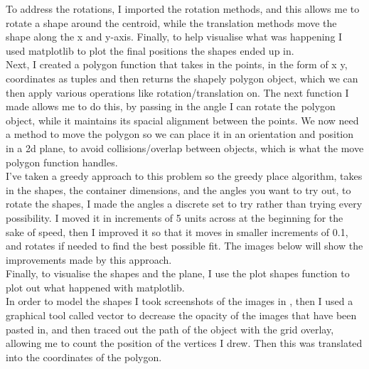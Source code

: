 \documentclass[a4paper]{article}
\begin{document}
    To address the rotations, I imported the rotation methods, and this allows me to rotate a shape around the centroid, while the translation methods move the shape along the x and y-axis. Finally, to help visualise what was happening I used matplotlib to plot the final positions the shapes ended up in.\\

    Next, I created a polygon function that takes in the points, in the form of x y, coordinates as tuples and then returns the shapely polygon object, which we can then apply various operations like rotation/translation on. The next function I made allows me to do this, by passing in the angle I can rotate the polygon object, while it maintains its spacial alignment between the points. We now need a method to move the polygon so we can place it in an orientation and position in a 2d plane, to avoid collisions/overlap between objects, which is what the move polygon function handles. \\


    I've taken a greedy approach to this problem so the greedy place algorithm, takes in the shapes, the container dimensions, and the angles you want to try out, to rotate the shapes, I made the angles a discrete set to try rather than trying every possibility. I moved it in increments of 5 units across at the beginning for the sake of speed, then I improved it so that it moves in smaller increments of 0.1, and rotates if needed to find the best possible fit. The images below will show the improvements made by this approach.\\

    Finally, to visualise the shapes and the plane, I use the plot shapes function to plot out what happened with matplotlib. \\

    In order to model the shapes I took screenshots of the images in \cite{bismark}, then I used a graphical tool called vector to decrease the opacity of the images that have been pasted in, and then traced out the path of the object with the grid overlay, allowing me to count the position of the vertices I drew. Then this was translated into the coordinates of the polygon.\\
\end{document}
